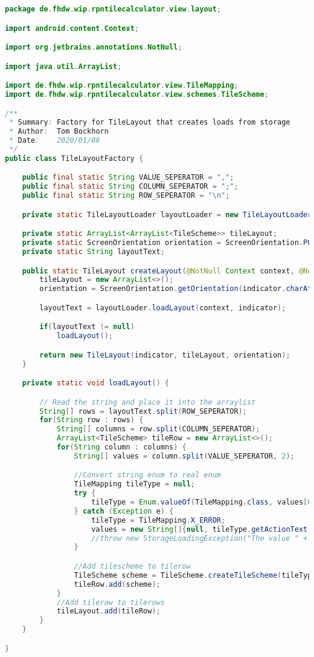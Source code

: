 \begin{lstlisting}[caption=TileLayoutFactory,label=list:TileLayoutFactory,language=Java]
package de.fhdw.wip.rpntilecalculator.view.layout;

import android.content.Context;

import org.jetbrains.annotations.NotNull;

import java.util.ArrayList;

import de.fhdw.wip.rpntilecalculator.view.TileMapping;
import de.fhdw.wip.rpntilecalculator.view.schemes.TileScheme;

/**
 * Summary: Factory for TileLayout that creates loads from storage
 * Author:  Tom Bockhorn
 * Date:    2020/01/06
 */
public class TileLayoutFactory {

    public final static String VALUE_SEPERATOR = ",";
    public final static String COLUMN_SEPERATOR = ";";
    public final static String ROW_SEPERATOR = "\n";

    private static TileLayoutLoader layoutLoader = new TileLayoutLoader();

    private static ArrayList<ArrayList<TileScheme>> tileLayout;
    private static ScreenOrientation orientation = ScreenOrientation.PORTRAIT;
    private static String layoutText;

    public static TileLayout createLayout(@NotNull Context context, @NotNull String indicator) {
        tileLayout = new ArrayList<>();
        orientation = ScreenOrientation.getOrientation(indicator.charAt(0));

        layoutText = layoutLoader.loadLayout(context, indicator);

        if(layoutText != null)
            loadLayout();

        return new TileLayout(indicator, tileLayout, orientation);
    }

    private static void loadLayout() {

        // Read the string and place it into the arraylist
        String[] rows = layoutText.split(ROW_SEPERATOR);
        for(String row : rows) {
            String[] columns = row.split(COLUMN_SEPERATOR);
            ArrayList<TileScheme> tileRow = new ArrayList<>();
            for(String column : columns) {
                String[] values = column.split(VALUE_SEPERATOR, 2);

                //Convert string enum to real enum
                TileMapping tileType = null;
                try {
                    tileType = Enum.valueOf(TileMapping.class, values[0]);
                } catch (Exception e) {
                    tileType = TileMapping.X_ERROR;
                    values = new String[]{null, tileType.getActionText()};
                    //throw new StorageLoadingException("The value " + values[0] + " could not be deciphered.");
                }

                //Add tilescheme to tilerow
                TileScheme scheme = TileScheme.createTileScheme(tileType, values[1]);
                tileRow.add(scheme);
            }
            //Add tilerow to tilerows
            tileLayout.add(tileRow);
        }
    }

}
\end{lstlisting}    

